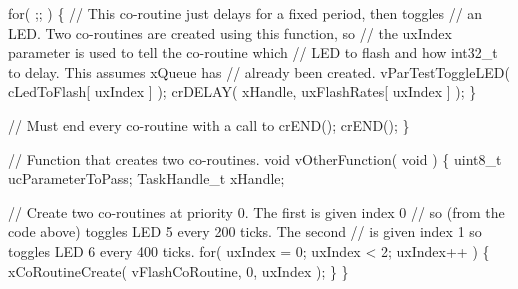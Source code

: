 \begin{DoxyPre}    for( ;; )
    \{
        // This co-routine just delays for a fixed period, then toggles
        // an LED.  Two co-routines are created using this function, so
        // the uxIndex parameter is used to tell the co-routine which
        // LED to flash and how int32\_t to delay.  This assumes xQueue has
        // already been created.
        vParTestToggleLED( cLedToFlash[ uxIndex ] );
        crDELAY( xHandle, uxFlashRates[ uxIndex ] );
    \}\end{DoxyPre}



\begin{DoxyPre}    // Must end every co-routine with a call to crEND();
    crEND();
\}\end{DoxyPre}



\begin{DoxyPre}// Function that creates two co-routines.
void vOtherFunction( void )
\{
uint8\_t ucParameterToPass;
TaskHandle\_t xHandle;\end{DoxyPre}



\begin{DoxyPre}    // Create two co-routines at priority 0.  The first is given index 0
    // so (from the code above) toggles LED 5 every 200 ticks.  The second
    // is given index 1 so toggles LED 6 every 400 ticks.
    for( uxIndex = 0; uxIndex < 2; uxIndex++ )
    \{
        xCoRoutineCreate( vFlashCoRoutine, 0, uxIndex );
    \}
\}
  \end{DoxyPre}
 